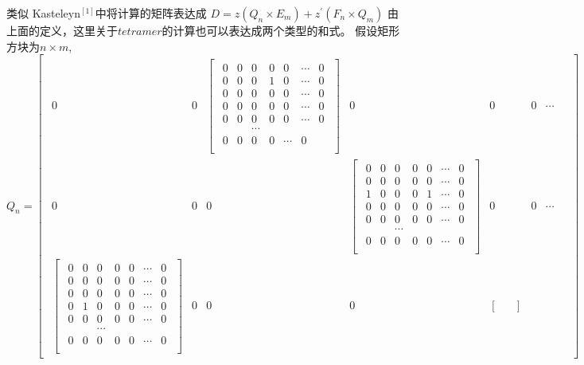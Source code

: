 \documentclass{amsc}          %
\numberwithin{equation}{section} %
\begin{document}
类似 Kasteleyn$^{[1]}$中将计算的矩阵表达成
$D=z(Q_{n}\times E_{m})  +  z^{'} (F_{n} \times Q_{m})$
由上面的定义，这里关于$tetramer$的计算也可以表达成两个类型的和式。
假设矩形方块为$n\times m$,
$$
  Q_{n} = \begin{bmatrix}\begin{smallmatrix}
  0& 0&
  \begin{bmatrix}\begin{smallmatrix}
 0& 0& 0&0&0&\cdots&0\\
 0& 0& 0&1&0&\cdots&0\\
 0& 0& 0&0&0&\cdots&0\\
 0& 0& 0&0&0&\cdots&0\\
 0& 0& 0&0&0&\cdots&0\\
 & & \cdots& &\\
0& 0&0& 0&\cdots&0\\
 \end{smallmatrix}\end{bmatrix}& 0& 0& 0& \cdots&\\
 0& 0& 0&
   \begin{bmatrix}\begin{smallmatrix}
 0& 0& 0&0&0&\cdots&0\\
 0& 0& 0&0&0&\cdots&0\\
 1& 0& 0&0&1&\cdots&0\\
 0& 0& 0&0&0&\cdots&0\\
 0& 0& 0&0&0&\cdots&0\\
 & & \cdots& &\\
0& 0&0& 0&0&\cdots&0\\
 \end{smallmatrix}\end{bmatrix}&0& 0&\cdots\\
 \begin{bmatrix}\begin{smallmatrix}
 0& 0& 0&0&0&\cdots&0\\
 0& 0& 0&0&0&\cdots&0\\
 0& 0& 0&0&0&\cdots&0\\
 0& 1& 0&0&0&\cdots&0\\
 0& 0& 0&0&0&\cdots&0\\
 & & \cdots& &\\
0& 0& 0& 0&0&\cdots&0\\
 \end{smallmatrix}\end{bmatrix}&
 0& 0& 0&
 \begin{bmatrix}\begin{smallmatrix}

\end{smallmatrix}
\end{bmatrix}
\end{smallmatrix}
\end{bmatrix}$$
\end{document}

